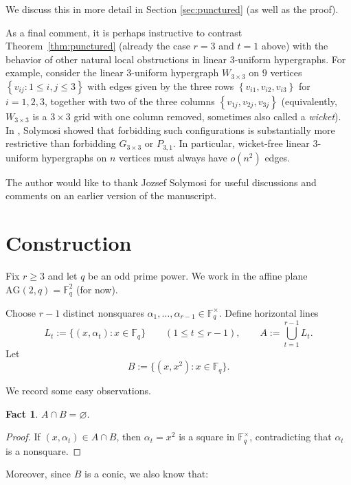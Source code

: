 \documentclass[11pt]{article}
\newtheorem{fact}[theorem]{Fact}
\theoremstyle{definition}
\theoremstyle{remark}
\newcommand{\F}{\mathbb{F}}
\newcommand{\AG}{\mathrm{AG}}
\begin{document}
We discuss this in more detail in Section \ref{sec:punctured} (as well as the proof).

As a final comment, it is perhaps instructive to contrast Theorem~\ref{thm:punctured} (already the case $r=3$ and $t=1$ above) with the behavior of other natural local obstructions in linear $3$-uniform hypergraphs. For example, consider the linear $3$-uniform hypergraph $W_{3 \times 3}$ on $9$ vertices $\left\{v_{ij}:1\le i,j\le 3\right\}$ with edges given by the three rows $\left\{v_{i1},v_{i2},v_{i3}\right\}$ for $i=1,2,3$, together with two of the three columns $\left\{v_{1j},v_{2j},v_{3j}\right\}$ (equivalently, $W_{3 \times 3}$ is a $3 \times 3$ grid with one column removed, sometimes also called a \emph{wicket}). In \cite{SolymosiWickets}, Solymosi showed that forbidding such configurations is substantially more restrictive than forbidding $G_{3 \times 3}$ or $P_{3,1}$. In particular, wicket-free linear $3$-uniform hypergraphs on $n$ vertices must always have $o(n^2)$ edges. 

\medskip

 The author would like to thank Jozsef Solymosi for useful discussions and comments on an earlier version of the manuscript. 

\section{Construction} \label{sec:construction}

Fix $r\ge 3$ and let $q$ be an odd prime power.
We work in the affine plane $\AG(2,q)=\F_q^2$ (for now).

Choose $r-1$ distinct nonsquares $\alpha_1,\dots,\alpha_{r-1}\in \F_q^\times$.
Define horizontal lines
\[
L_t := \{(x,\alpha_t): x\in \F_q\}\qquad(1\le t\le r-1),
\qquad
A := \bigcup_{t=1}^{r-1} L_t.
\]
Let
\[
B := \{(x,x^2): x\in \F_q\}.
\]

We record some easy observations.

\begin{fact}\label{lem:disjoint}
$A\cap B=\varnothing$.
\end{fact}

\begin{proof}
If $(x,\alpha_t)\in A\cap B$, then $\alpha_t=x^2$ is a square in $\F_q^\times$, contradicting that $\alpha_t$ is a nonsquare.
\end{proof}

Moreover, since $B$ is a conic, we also know that:
\end{document}
